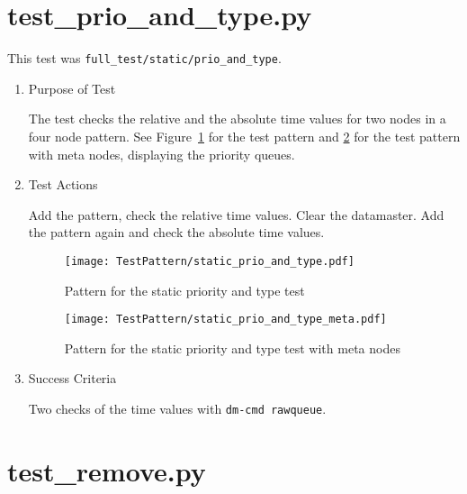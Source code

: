 \documentclass[12pt,a4paper]{report}
\begin{document}
\section{test\_prio\_and\_type.py}
This test was \texttt{full\_test/static/prio\_and\_type}.
\begin{enumerate}
  \item Purpose of Test

The test checks the relative and the absolute time values for two nodes
in a four node pattern.
See Figure~\ref{fig:Pattern_for_the_static_priority_and_type_test} for
the test pattern and
\ref{fig:Pattern_for_the_static_priority_and_type_test_with_meta_nodes}
for the test pattern with meta nodes,
displaying the priority queues.
  \item Test Actions

  Add the pattern, check the relative time values. Clear the datamaster.
  Add the pattern again and check the absolute time values.
    \begin{figure}
        \centering
        \texttt{[image: TestPattern/static\_prio\_and\_type.pdf]}
        \caption{Pattern for the static priority and type test}
        \label{fig:Pattern_for_the_static_priority_and_type_test}
    \end{figure}
    \begin{figure}
        \centering
        \texttt{[image: TestPattern/static\_prio\_and\_type\_meta.pdf]}
        \caption{Pattern for the static priority and type test with meta nodes}
        \label{fig:Pattern_for_the_static_priority_and_type_test_with_meta_nodes}
    \end{figure}
  \item Success Criteria

  Two checks of the time values with \texttt{dm-cmd rawqueue}.
\end{enumerate}

\section{test\_remove.py}
\end{document}
